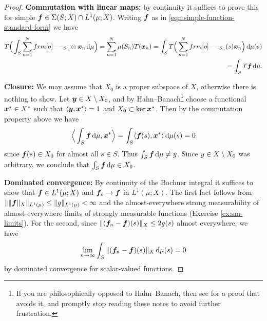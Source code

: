 \begin{proof}
  \textbf{Commutation with linear maps:} by continuity it suffices to prove this for simple $\bm{f} \in \Sigma(S;X) \cap L^1(\mu;X)$.
    Writing $\bm{f}$ as in \eqref{eqn:simple-function-standard-form} we have 
    \begin{equation*}
      \begin{aligned}
        T\Big(\int_S \sum_{n=1}^N \1_{S_n} \otimes \mb{x}_n \, \dd\mu \Big)
        = \sum_{n=1}^N \mu(S_n) T(\mb{x}_n)
        = \int_{S} T\Big(\sum_{n=1}^{N} \1_{S_n}(s) \mb{x}_{n} \Big) \, \dd\mu(s) \\
        = \int_S T\mb{f} \, \dd\mu.
      \end{aligned}
    \end{equation*}
        
  \textbf{Closure:} We may assume that $X_0$ is a proper subspace of $X$, otherwise there is nothing to show.
    Let $\bm{y} \in X \setminus X_0$, and by Hahn--Banach\footnote{If you are philosophically opposed to Hahn--Banach, then see \cite[Corollary 1.1.22]{HNVW16} for a proof that avoids it, and promptly stop reading these notes to avoid further frustration.} choose a functional $\bm{x}^* \in X^*$ such that $\langle \bm{y}, \bm{x}^* \rangle = 1$ and $X_0 \subset \ker \bm{x}^*$.
    Then by the commutation property above we have
    \begin{equation*}
      \Big\langle \int_S \bm{f} \, \mathrm{d}\mu, \bm{x}^* \Big\rangle = \int_S \langle \bm{f}(s), \bm{x}^* \rangle \, \mathrm{d}\mu(s) = 0
    \end{equation*}
    since $\bm{f}(s) \in X_0$ for almost all $s \in S$.
    Thus $\int_S \bm{f} \, \mathrm{d}\mu \neq y$.
    Since $y \in X \setminus X_0$ was arbitrary, we conclude that $\int_S \bm{f} \, \mathrm{d}\mu \in X_0$.

  \textbf{Dominated convergence:}
    By continuity of the Bochner integral it suffices to show that $\bm{f} \in L^1(\mu;X)$ and $\bm{f}_n \to \bm{f}$ in $L^1(\mu;X)$.
    The first fact follows from $\|\|\bm{f}\|_{X}\|_{L^1(\mu)} \leq \|g\|_{L^1(\mu)} < \infty$ and the almost-everywhere strong measurability of almost-everywhere limits of strongly measurable functions (Exercise \ref{ex:sm-limits}).
    For the second, since $\|(\bm{f}_n - \bm{f})(s)\|_X \leq 2g(s)$ almost everywhere, we have
    \begin{equation*}
      \lim_{n \to \infty} \int_S \|(\bm{f}_n - \bm{f})(s)\|_X \, \mathrm{d}\mu(s) = 0
    \end{equation*}
    by dominated convergence for scalar-valued functions.
    

\end{proof}
